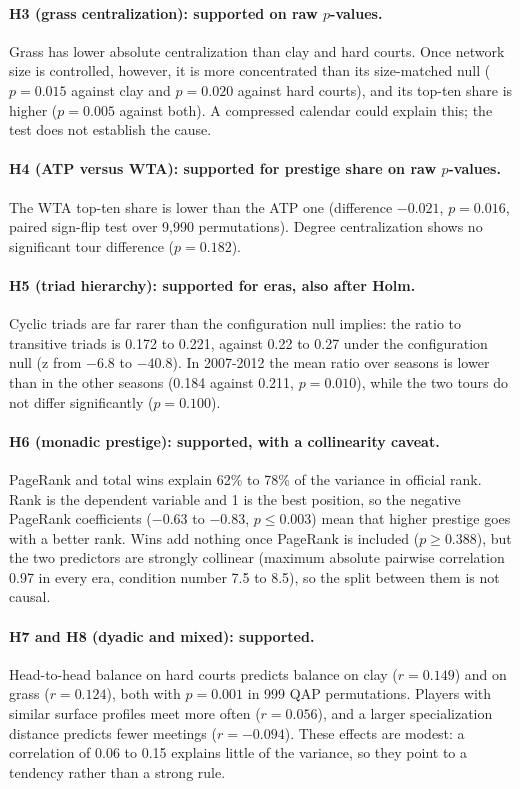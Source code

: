 \documentclass[12pt, a4paper]{article}
\begin{document}
\paragraph{H3 (grass centralization): supported on raw $p$-values.} Grass has lower absolute centralization than clay and hard courts. Once network size is controlled, however, it is more concentrated than its size-matched null ($p = 0.015$ against clay and $p = 0.020$ against hard courts), and its top-ten share is higher ($p = 0.005$ against both). A compressed calendar could explain this; the test does not establish the cause.

\paragraph{H4 (ATP versus WTA): supported for prestige share on raw $p$-values.} The WTA top-ten share is lower than the ATP one (difference $-0.021$, $p = 0.016$, paired sign-flip test over 9,990 permutations). Degree centralization shows no significant tour difference ($p = 0.182$).

\paragraph{H5 (triad hierarchy): supported for eras, also after Holm.} Cyclic triads are far rarer than the configuration null implies: the ratio to transitive triads is 0.172 to 0.221, against 0.22 to 0.27 under the configuration null (z from $-6.8$ to $-40.8$). In 2007-2012 the mean ratio over seasons is lower than in the other seasons (0.184 against 0.211, $p = 0.010$), while the two tours do not differ significantly ($p = 0.100$).

\paragraph{H6 (monadic prestige): supported, with a collinearity caveat.} PageRank and total wins explain 62\% to 78\% of the variance in official rank. Rank is the dependent variable and 1 is the best position, so the negative PageRank coefficients ($-0.63$ to $-0.83$, $p \le 0.003$) mean that higher prestige goes with a better rank. Wins add nothing once PageRank is included ($p \ge 0.388$), but the two predictors are strongly collinear (maximum absolute pairwise correlation 0.97 in every era, condition number 7.5 to 8.5), so the split between them is not causal.

\paragraph{H7 and H8 (dyadic and mixed): supported.} Head-to-head balance on hard courts predicts balance on clay ($r = 0.149$) and on grass ($r = 0.124$), both with $p = 0.001$ in 999 QAP permutations. Players with similar surface profiles meet more often ($r = 0.056$), and a larger specialization distance predicts fewer meetings ($r = -0.094$). These effects are modest: a correlation of 0.06 to 0.15 explains little of the variance, so they point to a tendency rather than a strong rule.
\end{document}
